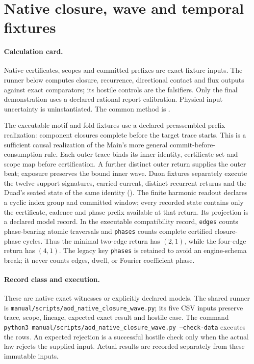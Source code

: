 \section{Native closure, wave and temporal fixtures}
\label{manual:m1-native-fixtures}

\paragraph{Calculation card.}
Native certificates, scopes and committed prefixes are exact fixture inputs.
The runner below computes closure, recurrence, directional contact and flux
outputs against exact comparators; its hostile controls are the falsifiers.
Only the final demonstration uses a declared rational report calibration.
Physical input uncertainty is uninstantiated. The common method is
.


The executable motif and fold fixtures use a declared preassembled-prefix
realization: component closures complete before the target trace starts.
This is a sufficient causal realization of the Main's more general
commit-before-consumption rule. Each outer trace binds its inner identity,
certificate set and scope map before certification. A further distinct outer
return supplies the outer beat; exposure preserves the bound inner wave.
Duon fixtures separately execute the twelve support signatures, carried current,
distinct recurrent returns and the Duad's seated state of the same identity
().
The finite harmonic readout declares a cyclic index group and committed window;
every recorded state contains only the certificate, cadence and phase prefix
available at that return. Its projection is a declared model record.
In the executable compatibility record, \texttt{edges} counts phase-bearing
atomic traversals and \texttt{phases} counts complete certified closure-phase
cycles. Thus the minimal two-edge return has \((2,1)\), while the four-edge
return has \((4,1)\). The legacy key \texttt{phases} is retained to avoid an
engine-schema break; it never counts edges, dwell, or Fourier coefficient phase.
\paragraph{Record class and execution.}
These are native exact witnesses or explicitly declared models. The shared
runner is \texttt{manual/scripts/aod\_native\_closure\_wave.py}; its five CSV
inputs preserve trace, scope, lineage, expected exact result and hostile case.
The command \texttt{python3 manual/scripts/aod\_native\_closure\_wave.py --check-data}
executes the rows. An expected rejection is a successful hostile check only
when the actual law rejects the supplied input. Actual results are recorded
separately from these immutable inputs.

